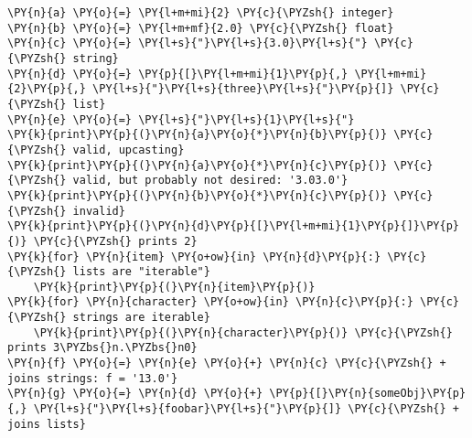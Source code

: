 \begin{Verbatim}[commandchars=\\\{\}]
\PY{n}{a} \PY{o}{=} \PY{l+m+mi}{2} \PY{c}{\PYZsh{} integer}
\PY{n}{b} \PY{o}{=} \PY{l+m+mf}{2.0} \PY{c}{\PYZsh{} float}
\PY{n}{c} \PY{o}{=} \PY{l+s}{"}\PY{l+s}{3.0}\PY{l+s}{"} \PY{c}{\PYZsh{} string}
\PY{n}{d} \PY{o}{=} \PY{p}{[}\PY{l+m+mi}{1}\PY{p}{,} \PY{l+m+mi}{2}\PY{p}{,} \PY{l+s}{"}\PY{l+s}{three}\PY{l+s}{"}\PY{p}{]} \PY{c}{\PYZsh{} list}
\PY{n}{e} \PY{o}{=} \PY{l+s}{"}\PY{l+s}{1}\PY{l+s}{"}
\PY{k}{print}\PY{p}{(}\PY{n}{a}\PY{o}{*}\PY{n}{b}\PY{p}{)} \PY{c}{\PYZsh{} valid, upcasting}
\PY{k}{print}\PY{p}{(}\PY{n}{a}\PY{o}{*}\PY{n}{c}\PY{p}{)} \PY{c}{\PYZsh{} valid, but probably not desired: '3.03.0'}
\PY{k}{print}\PY{p}{(}\PY{n}{b}\PY{o}{*}\PY{n}{c}\PY{p}{)} \PY{c}{\PYZsh{} invalid}
\PY{k}{print}\PY{p}{(}\PY{n}{d}\PY{p}{[}\PY{l+m+mi}{1}\PY{p}{]}\PY{p}{)} \PY{c}{\PYZsh{} prints 2}
\PY{k}{for} \PY{n}{item} \PY{o+ow}{in} \PY{n}{d}\PY{p}{:} \PY{c}{\PYZsh{} lists are "iterable"}
    \PY{k}{print}\PY{p}{(}\PY{n}{item}\PY{p}{)}
\PY{k}{for} \PY{n}{character} \PY{o+ow}{in} \PY{n}{c}\PY{p}{:} \PY{c}{\PYZsh{} strings are iterable}
    \PY{k}{print}\PY{p}{(}\PY{n}{character}\PY{p}{)} \PY{c}{\PYZsh{} prints 3\PYZbs{}n.\PYZbs{}n0}
\PY{n}{f} \PY{o}{=} \PY{n}{e} \PY{o}{+} \PY{n}{c} \PY{c}{\PYZsh{} + joins strings: f = '13.0'}
\PY{n}{g} \PY{o}{=} \PY{n}{d} \PY{o}{+} \PY{p}{[}\PY{n}{someObj}\PY{p}{,} \PY{l+s}{"}\PY{l+s}{foobar}\PY{l+s}{"}\PY{p}{]} \PY{c}{\PYZsh{} + joins lists}
\end{Verbatim}
